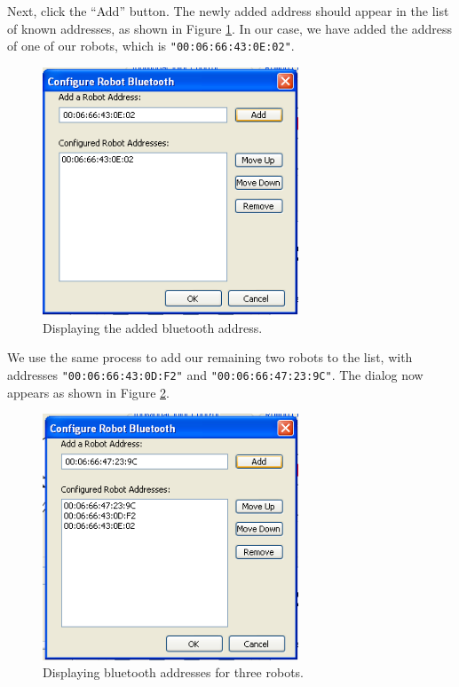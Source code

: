 \documentclass{article}
\begin{document}
Next, click the ``Add'' button. The newly added address should appear in the 
list of known addresses, as shown in Figure \ref{fig:shot6.png}. In our case, we have added the 
address of one of our robots, which is \texttt{"00:06:66:43:0E:02"}.

\begin{figure}[H]
\begin{center}
\includegraphics[width=3in]{images/shot6.png}
\end{center}
\caption{\label{fig:shot6.png} Displaying the added bluetooth address.}
\end{figure}

We use the same process to add our remaining two robots to the list,
with addresses \texttt{"00:06:66:43:0D:F2"} and 
\texttt{"00:06:66:47:23:9C"}. The dialog now appears as shown in
Figure \ref{fig:shot8.png}.

\begin{figure}[H]
\begin{center}
\includegraphics[width=3in]{images/shot8.png}
\end{center}
\caption{\label{fig:shot8.png} Displaying bluetooth addresses for three robots.}
\end{figure}
\end{document}
